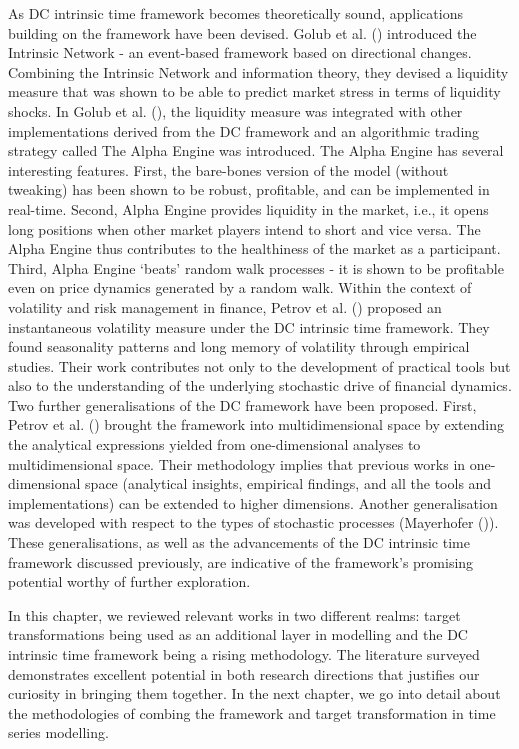 As DC intrinsic time framework becomes theoretically sound, applications building on the framework have been devised. Golub et al. (\citeyear{golub2016multi}) introduced the Intrinsic Network - an event-based framework based on directional changes. Combining the Intrinsic Network and information theory, they devised a liquidity measure that was shown to be able to predict market stress in terms of liquidity shocks. In Golub et al. (\citeyear{golub2018alpha}), the liquidity measure was integrated with other implementations derived from the DC framework and an algorithmic trading strategy called The Alpha Engine was introduced. The Alpha Engine has several interesting features. First, the bare-bones version of the model (without tweaking) has been shown to be robust, profitable, and can be implemented in real-time. Second, Alpha Engine provides liquidity in the market, i.e., it opens long positions when other market players intend to short and vice versa. The Alpha Engine thus contributes to the healthiness of the market as a participant. Third, Alpha Engine `beats' random walk processes - it is shown to be profitable even on price dynamics generated by a random walk. Within the context of volatility and risk management in finance, Petrov et al. (\citeyear{petrov2019instantaneous}) proposed an instantaneous volatility measure under the DC intrinsic time framework. They found seasonality patterns and long memory of volatility through empirical studies. Their work contributes not only to the development of practical tools but also to the understanding of the underlying stochastic drive of financial dynamics. Two further generalisations of the DC framework have been proposed. First, Petrov et al. (\citeyear{petrov2019intrinsic}) brought the framework into multidimensional space by extending the analytical expressions yielded from one-dimensional analyses to multidimensional space. Their methodology implies that previous works in one-dimensional space (analytical insights, empirical findings, and all the tools and implementations) can be extended to higher dimensions. Another generalisation was developed with respect to the types of stochastic processes (Mayerhofer (\citeyear{mayerhofer2019three})). These generalisations, as well as the advancements of the DC intrinsic time framework discussed previously, are indicative of the framework's promising potential worthy of further exploration.

In this chapter, we reviewed relevant works in two different realms: target transformations being used as an additional layer in modelling and the DC intrinsic time framework being a rising methodology. The literature surveyed demonstrates excellent potential in both research directions that justifies our curiosity in bringing them together. In the next chapter, we go into detail about the methodologies of combing the framework and target transformation in time series modelling.

